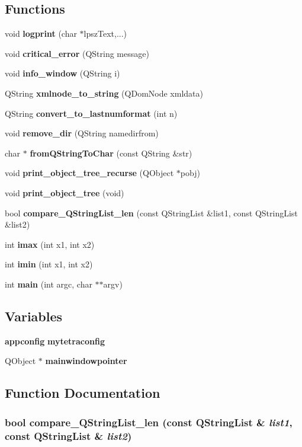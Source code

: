 \subsection*{Functions}
\begin{CompactItemize}
\item 
void {\bf logprint} (char $\ast$lpsz\-Text,...)
\item 
void {\bf critical\_\-error} (QString message)
\item 
void {\bf info\_\-window} (QString i)
\item 
QString {\bf xmlnode\_\-to\_\-string} (QDom\-Node xmldata)
\item 
QString {\bf convert\_\-to\_\-lastnumformat} (int n)
\item 
void {\bf remove\_\-dir} (QString namedirfrom)
\item 
char $\ast$ {\bf from\-QString\-To\-Char} (const QString \&str)
\item 
void {\bf print\_\-object\_\-tree\_\-recurse} (QObject $\ast$pobj)
\item 
void {\bf print\_\-object\_\-tree} (void)
\item 
bool {\bf compare\_\-QString\-List\_\-len} (const QString\-List \&list1, const QString\-List \&list2)
\item 
int {\bf imax} (int x1, int x2)
\item 
int {\bf imin} (int x1, int x2)
\item 
int {\bf main} (int argc, char $\ast$$\ast$argv)
\end{CompactItemize}
\subsection*{Variables}
\begin{CompactItemize}
\item 
{\bf appconfig} {\bf mytetraconfig}
\item 
QObject $\ast$ {\bf mainwindowpointer}
\end{CompactItemize}


\subsection{Function Documentation}
\subsubsection{\setlength{\rightskip}{0pt plus 5cm}bool compare\_\-QString\-List\_\-len (const QString\-List \& {\em list1}, const QString\-List \& {\em list2})}\label{main_8cpp_4b9267e7db7804b40590ebb0aae4c257}




